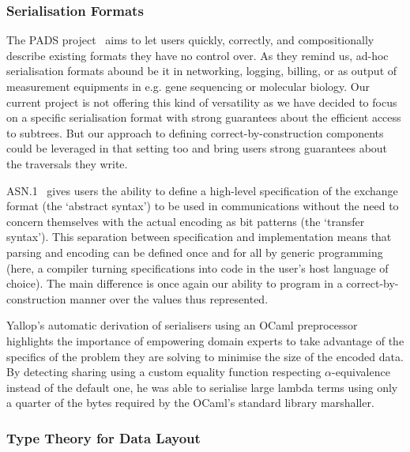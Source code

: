 \subsubsection{Serialisation Formats}

The PADS project~\citep{DBLP:conf/popl/MandelbaumFWFG07} aims to let users
quickly, correctly, and compositionally describe existing formats they
have no control over.
%
As they remind us, ad-hoc serialisation formats abound be it in
networking, logging, billing, or as output of measurement equipments
in e.g. gene sequencing or molecular biology.
%
Our current project is not offering this kind of versatility as we have
decided to focus on a specific serialisation format with strong
guarantees about the efficient access to subtrees.
%
But our approach to defining correct-by-construction components could
be leveraged in that setting too and bring users strong guarantees about
the traversals they write.

ASN.1~\citep{MANUAL:book/larmouth1999} gives users the ability to define
a high-level specification of the exchange format (the `abstract syntax')
to be used in communications without the need to concern themselves with
the actual encoding as bit patterns (the `transfer syntax').
%
This separation between specification and implementation means that parsing
and encoding can be defined once and for all by generic programming
(here, a compiler turning specifications into code in the user's host
language of choice).
%
The main difference is once again our ability to program in a
correct-by-construction manner over the values thus represented.


Yallop's automatic derivation of serialisers using an OCaml
preprocessor~\citep{DBLP:conf/ml/Yallop07} highlights the importance
of empowering domain experts to take advantage of the specifics of
the problem they are solving to minimise the size of the encoded data.
%
By detecting sharing using a custom equality function respecting
$\alpha$-equivalence instead of the default one, he was able to
serialise large lambda terms using only
a quarter of the bytes required
by the OCaml's standard library marshaller.

\subsubsection{Type Theory for Data Layout}

